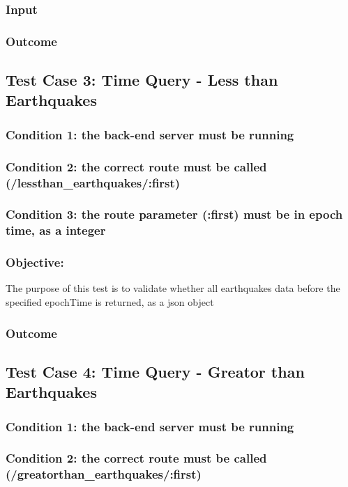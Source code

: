 \subsubsection{Input}
\subsubsection{Outcome}


\subsection{Test Case 3: Time Query - Less than Earthquakes}
\subsubsection{Condition 1: the back-end server must be running}
\subsubsection{Condition 2: the correct route must be called (/lessthan\_earthquakes/:first)}
\subsubsection{Condition 3: the route parameter (:first) must be in epoch time, as a integer}
\subsubsection{Objective:} The purpose of this test is to validate whether all  earthquakes data before the specified epochTime is returned, as a json object
\subsubsection{Outcome}


\subsection{Test Case 4: Time Query - Greator than Earthquakes}
\subsubsection{Condition 1: the back-end server must be running}
\subsubsection{Condition 2: the correct route must be called (/greatorthan\_earthquakes/:first)}
